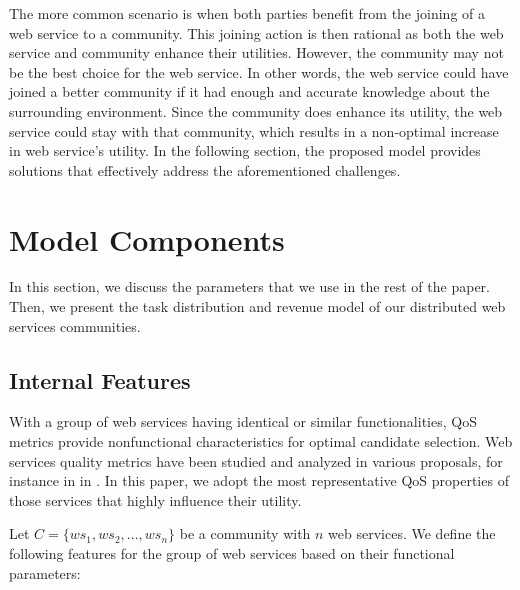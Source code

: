\documentclass[11pt,onecolumn]{IEEEtran}
\begin{document}
The more common scenario is when both parties benefit from the joining of a web service to a community. This joining action is then rational as both the web service and community enhance their utilities. However, the community may not be the best choice for the web service. In other words, the web service could have joined a better community if it had enough and accurate knowledge about the surrounding environment. Since the community does enhance its utility, the web service could stay with that community, which results in a non-optimal increase in web service's utility. In the following section, the proposed model provides solutions that effectively address the aforementioned challenges.

\section{Model Components}\label{s:themodelcomponents}

In this section, we discuss the parameters that we use in the rest of the paper. Then, we present the task distribution and revenue model of our distributed web services communities.

\subsection{Internal Features}\label{s:if}

With a group of web services having identical or similar functionalities, QoS metrics provide nonfunctional characteristics for optimal candidate selection. Web services quality metrics have been studied and analyzed in various proposals, for instance in in \cite{Ardagna:2007:ASC:1263152.1263531,Menasce:2002:QIW:613357.613758,10.1109/ISSRE.2011.17}. In this paper, we adopt the most representative QoS properties of those services that highly influence their utility. 

Let $C = \{ws_1,ws_2,..., ws_n\}$ be a community with $n$ web services. We define the following features for the group of web services based on their functional parameters:
\end{document}
